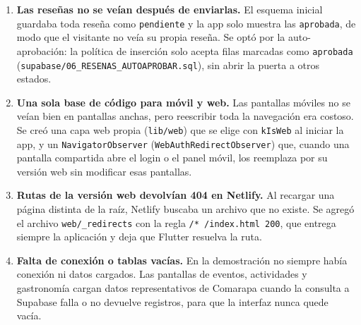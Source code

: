 \begin{enumerate}
  \item \textbf{Las reseñas no se veían después de enviarlas.} El
  esquema inicial guardaba toda reseña como \texttt{pendiente} y la app
  solo muestra las \texttt{aprobada}, de modo que el visitante no veía
  su propia reseña. Se optó por la auto-aprobación: la política de
  inserción solo acepta filas marcadas como \texttt{aprobada}
  (\texttt{supabase/06\_RESENAS\_AUTOAPROBAR.sql}), sin abrir la puerta
  a otros estados.

  \item \textbf{Una sola base de código para móvil y web.} Las pantallas
  móviles no se veían bien en pantallas anchas, pero reescribir toda la
  navegación era costoso. Se creó una capa web propia
  (\texttt{lib/web}) que se elige con \texttt{kIsWeb} al iniciar la app,
  y un \texttt{NavigatorObserver} (\texttt{WebAuthRedirectObserver}) que,
  cuando una pantalla compartida abre el login o el panel móvil, los
  reemplaza por su versión web sin modificar esas pantallas.

  \item \textbf{Rutas de la versión web devolvían 404 en Netlify.} Al
  recargar una página distinta de la raíz, Netlify buscaba un archivo
  que no existe. Se agregó el archivo \texttt{web/\_redirects} con la
  regla \texttt{/* /index.html 200}, que entrega siempre la aplicación y
  deja que Flutter resuelva la ruta.

  \item \textbf{Falta de conexión o tablas vacías.} En la demostración
  no siempre había conexión ni datos cargados. Las pantallas de eventos,
  actividades y gastronomía cargan datos representativos de Comarapa
  cuando la consulta a Supabase falla o no devuelve registros, para que
  la interfaz nunca quede vacía.
\end{enumerate}
